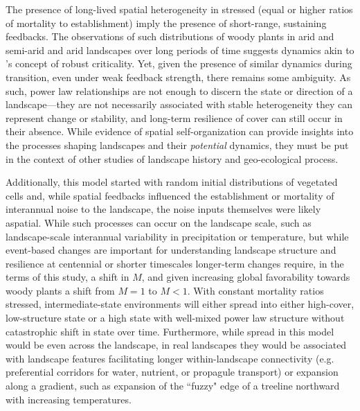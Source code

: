 \documentclass[10pt]{article}
\begin{document}
\begin{linenumbers}
The presence of long-lived spatial heterogeneity in stressed (equal or higher ratios of mortality to establishment) imply the presence of short-range, sustaining feedbacks. The observations of such distributions of woody plants in arid and semi-arid and arid landscapes over long periods of time suggests dynamics akin to \citet{Pascual2005}'s concept of robust criticality. Yet, given the presence of similar dynamics during transition, even under weak feedback strength, there remains some ambiguity.  As such, power law relationships are not enough to discern the state or direction of a landscape---they are not necessarily associated with stable heterogeneity they can represent change or stability, and long-term resilience of cover can still occur in their absence. While evidence of spatial self-organization can provide insights into the processes shaping landscapes and their \textit{potential} dynamics, they must be put in the context of other studies of landscape history and geo-ecological process.

Additionally, this model started with random initial distributions of vegetated cells and, while spatial feedbacks influenced the establishment or mortality of interannual noise to the landscape, the noise inputs themselves were likely aspatial. While such processes can occur on the landscape scale, such as landscape-scale interannual variability in precipitation or temperature, but while event-based changes are important for understanding landscape structure and resilience at centennial or shorter timescales longer-term changes require, in the terms of this study, a shift in $M$, and given increasing global favorability towards woody plants a shift from $M = 1$ to $M < 1$. With constant mortality ratios stressed, intermediate-state environments will either spread into either high-cover, low-structure state or a high state with well-mixed power law structure without catastrophic shift in state over time. Furthermore, while spread in this model would be even across the landscape, in real landscapes they would be associated with landscape features facilitating longer within-landscape connectivity (e.g. preferential corridors for water, nutrient, or propagule transport) or expansion along a gradient, such as expansion of the ``fuzzy" edge of a treeline northward with increasing temperatures. 


\end{linenumbers}
\end{document}
